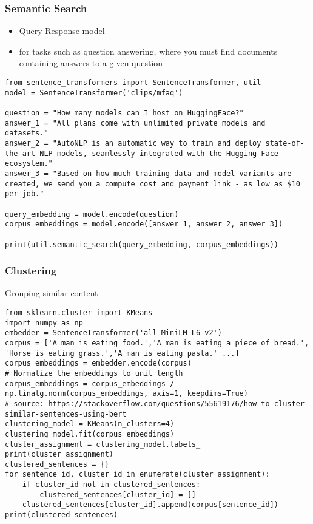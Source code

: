 \begin{frame}[fragile]\frametitle{Semantic Search}

\begin{itemize}
\item Query-Response model
\item for tasks such as question answering, where you must find documents containing answers to a given question
\end{itemize}


\begin{lstlisting}
from sentence_transformers import SentenceTransformer, util
model = SentenceTransformer('clips/mfaq')

question = "How many models can I host on HuggingFace?"
answer_1 = "All plans come with unlimited private models and datasets."
answer_2 = "AutoNLP is an automatic way to train and deploy state-of-the-art NLP models, seamlessly integrated with the Hugging Face ecosystem."
answer_3 = "Based on how much training data and model variants are created, we send you a compute cost and payment link - as low as $10 per job."

query_embedding = model.encode(question)
corpus_embeddings = model.encode([answer_1, answer_2, answer_3])

print(util.semantic_search(query_embedding, corpus_embeddings))
\end{lstlisting}

\end{frame}

\begin{frame}[fragile]\frametitle{Clustering}

Grouping similar content


\begin{lstlisting}
from sklearn.cluster import KMeans
import numpy as np
embedder = SentenceTransformer('all-MiniLM-L6-v2')
corpus = ['A man is eating food.','A man is eating a piece of bread.', 'Horse is eating grass.','A man is eating pasta.' ...]
corpus_embeddings = embedder.encode(corpus)
# Normalize the embeddings to unit length
corpus_embeddings = corpus_embeddings /  np.linalg.norm(corpus_embeddings, axis=1, keepdims=True)
# source: https://stackoverflow.com/questions/55619176/how-to-cluster-similar-sentences-using-bert
clustering_model = KMeans(n_clusters=4)
clustering_model.fit(corpus_embeddings)
cluster_assignment = clustering_model.labels_
print(cluster_assignment)
clustered_sentences = {}
for sentence_id, cluster_id in enumerate(cluster_assignment):
    if cluster_id not in clustered_sentences:
        clustered_sentences[cluster_id] = []
    clustered_sentences[cluster_id].append(corpus[sentence_id])
print(clustered_sentences)
\end{lstlisting}

\end{frame}


